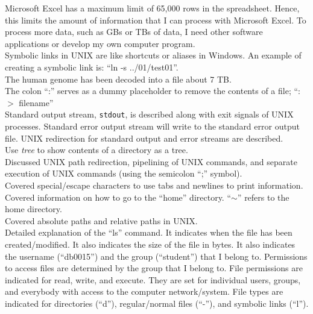 Microsoft Excel has a maximum limit of 65,000 rows in the spreadsheet. Hence, this limits the amount of information that I can process with Microsoft Excel. To process more data, such as GBs or TBs of data, I need other software applications or develop my own computer program. \\ 

Symbolic links in UNIX are like shortcuts or aliases in Windows. An example of creating a symbolic link is: ``ln -s ../01/test01''. \\

The human genome has been decoded into a file about 7 TB. \\

The colon ``:'' serves as a dummy placeholder to remove the contents of a file; ``: $>$ filename'' \\

Standard output stream, {\tt stdout}, is described along with exit signals of UNIX processes. Standard error output stream will write to the standard error output file. UNIX redirection for standard output and error streams are described. \\

Use {\it tree} to show contents of a directory as a tree. \\

Discussed UNIX path redirection, pipelining of UNIX commands, and separate execution of UNIX commands (using the semicolon ``;'' symbol). \\

Covered special/escape characters to use tabs and newlines to print information. \\

Covered information on how to go to the ``home'' directory. ``$\sim$'' refers to the home directory. \\


Covered absolute paths and relative paths in UNIX. \\

Detailed explanation of the ``ls'' command. It indicates when the file has been created/modified. It also indicates the size of the file in bytes. It also indicates the username (``db0015'') and the group (``student'') that I belong to. Permissions to access files are determined by the group that I belong to. File permissions are indicated for read, write, and execute. They are set for individual users, groups, and everybody with access to the computer network/system. File types are indicated for directories (``d''), regular/normal files (``-''), and symbolic links (``l''). \\

